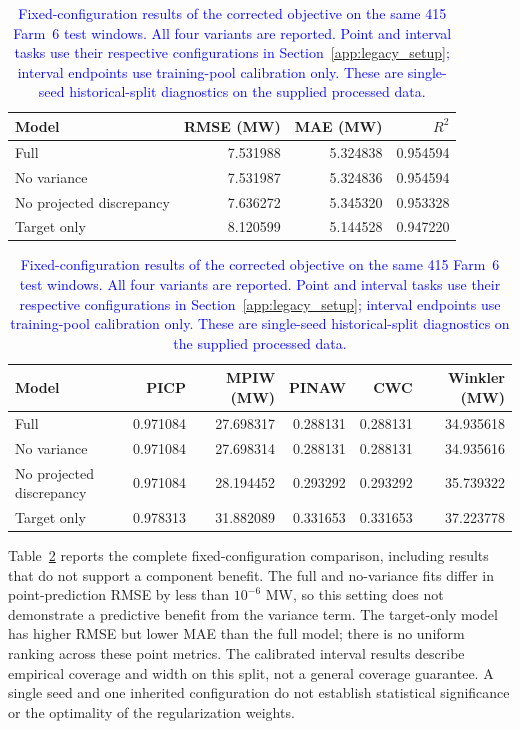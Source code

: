 \begin{table}[htbp]
\centering
{\color{blue}
\caption{\textcolor{blue}{Fixed-configuration results of the corrected objective on the same 415 Farm~6 test windows. All four variants are reported. Point and interval tasks use their respective configurations in Section~\ref{app:legacy_setup}; interval endpoints use training-pool calibration only. These are single-seed historical-split diagnostics on the supplied processed data.}}
\label{tab:corrected_diagnostic}
\setlength{\tabcolsep}{3pt}
\begin{tabular}{lrrr}
\toprule
Model & RMSE (MW) & MAE (MW) & $R^2$ \\
\midrule
Full & 7.531988 & 5.324838 & 0.954594 \\
No variance & 7.531987 & 5.324836 & 0.954594 \\
No projected discrepancy & 7.636272 & 5.345320 & 0.953328 \\
Target only & 8.120599 & 5.144528 & 0.947220 \\
\bottomrule
\end{tabular}

\vspace{2mm}
\begin{tabular}{lrrrrr}
\toprule
Model & PICP & MPIW (MW) & PINAW & CWC & Winkler (MW) \\
\midrule
Full & 0.971084 & 27.698317 & 0.288131 & 0.288131 & 34.935618 \\
No variance & 0.971084 & 27.698314 & 0.288131 & 0.288131 & 34.935616 \\
No projected discrepancy & 0.971084 & 28.194452 & 0.293292 & 0.293292 & 35.739322 \\
Target only & 0.978313 & 31.882089 & 0.331653 & 0.331653 & 37.223778 \\
\bottomrule
\end{tabular}
}
\end{table}

{\color{blue}Table~\ref{tab:corrected_diagnostic} reports the complete fixed-configuration comparison, including results that do not support a component benefit. The full and no-variance fits differ in point-prediction RMSE by less than $10^{-6}$ MW, so this setting does not demonstrate a predictive benefit from the variance term. The target-only model has higher RMSE but lower MAE than the full model; there is no uniform ranking across these point metrics. The calibrated interval results describe empirical coverage and width on this split, not a general coverage guarantee. A single seed and one inherited configuration do not establish statistical significance or the optimality of the regularization weights.}

